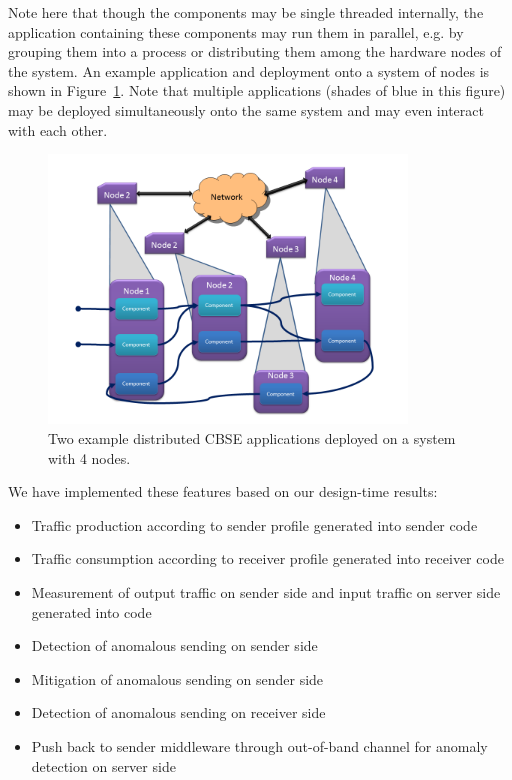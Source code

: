 Note here that though the components may be single threaded
internally, the application containing these components may run them
in parallel, e.g. by grouping them into a process or distributing them
among the hardware nodes of the system.  An example application and
deployment onto a system of nodes is shown in Figure~\ref{fig:cbse}.
Note that multiple applications (shades of blue in this figure) may be
deployed simultaneously onto the same system and may even interact
with each other.

\begin{figure}[ht!]
  \centering
  \includegraphics[width=0.85\textwidth]{../doc/src/images/results/cbse.png}
  \caption{Two example distributed CBSE applications deployed on a system with
    4 nodes.}
  \label{fig:cbse}
\end{figure}
   
We have implemented these features based on our design-time results:

\begin{itemize}
\item Traffic production according to sender profile generated into
  sender code
\item Traffic consumption according to receiver profile generated into
  receiver code
\item Measurement of output traffic on sender side and input traffic on
  server side generated into code
\item Detection of anomalous sending on sender side
\item Mitigation of anomalous sending on sender side
\item Detection of anomalous sending on receiver side
\item Push back to sender middleware through out-of-band channel for
  anomaly detection on server side
\end{itemize}

